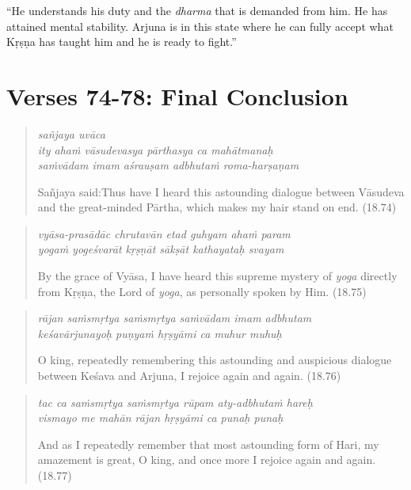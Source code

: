 \documentclass[12pt, twoside, openright]{memoir}
\begin{document}
\enquote{He understands his duty and the \textit{dharma} that is demanded from him. He has attained mental stability. Arjuna is in this state where he can fully accept what Kṛṣṇa has taught him and he is ready to fight.}

\section{Verses 74-78: Final Conclusion}\label{sec-verses-74-78-final-conclusion}


\par
\begin{verse}
\textit{sañjaya uvāca} \\
\textit{ity ahaṁ vāsudevasya pārthasya ca mahātmanaḥ} \\
\textit{saṁvādam imam aśrauṣam adbhutaṁ roma-harṣaṇam}

\noindent \quad Sañjaya said:\linebreak Thus have I heard this astounding dialogue between Vāsudeva and the great-minded Pārtha, which makes my hair stand on end. (18.74)
\end{verse}
\par



\par
\begin{verse}
\textit{vyāsa-prasādāc chrutavān etad guhyam ahaṁ param} \\
\textit{yogaṁ yogeśvarāt kṛṣṇāt sākṣāt kathayataḥ svayam}

\noindent By the grace of Vyāsa, I have heard this supreme mystery of \textit{yoga} directly from Kṛṣṇa, the Lord of \textit{yoga}, as personally spoken by Him. (18.75)
\end{verse}
\par



\par
\begin{verse}
\textit{rājan saṁsmṛtya saṁsmṛtya saṁvādam imam adbhutam} \\
\textit{keśavārjunayoḥ puṇyaṁ hṛṣyāmi ca muhur muhuḥ}

\noindent O king, repeatedly remembering this astounding and auspicious dialogue between Keśava and Arjuna, I rejoice again and again. (18.76)
\end{verse}
\par



\par
\begin{verse}
\textit{tac ca saṁsmṛtya saṁsmṛtya rūpam aty-adbhutaṁ hareḥ} \\
\textit{vismayo me mahān rājan hṛṣyāmi ca punaḥ punaḥ}

\noindent And as I repeatedly remember that most astounding form of Hari, my amazement is great, O king, and once more I rejoice again and again. (18.77)
\end{verse}
\par
\end{document}
